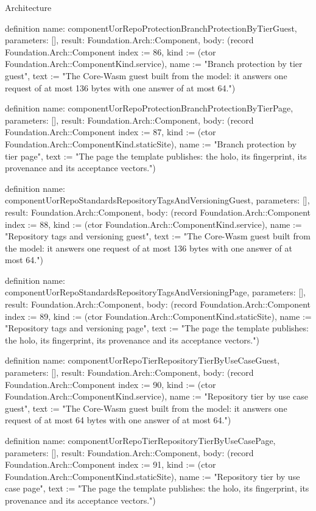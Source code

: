 \begin{lexlean}{Architecture}
\begin{semanticmodule}
definition{
  name: componentUorRepoProtectionBranchProtectionByTierGuest,
  parameters: [],
  result: Foundation.Arch::Component,
  body: (record Foundation.Arch::Component {index := 86, kind := (ctor Foundation.Arch::ComponentKind.service), name := "Branch protection by tier guest", text := "The Core-Wasm guest built from the model: it answers one request of at most 136 bytes with one answer of at most 64."})
}

definition{
  name: componentUorRepoProtectionBranchProtectionByTierPage,
  parameters: [],
  result: Foundation.Arch::Component,
  body: (record Foundation.Arch::Component {index := 87, kind := (ctor Foundation.Arch::ComponentKind.staticSite), name := "Branch protection by tier page", text := "The page the template publishes: the holo, its fingerprint, its provenance and its acceptance vectors."})
}

definition{
  name: componentUorRepoStandardsRepositoryTagsAndVersioningGuest,
  parameters: [],
  result: Foundation.Arch::Component,
  body: (record Foundation.Arch::Component {index := 88, kind := (ctor Foundation.Arch::ComponentKind.service), name := "Repository tags and versioning guest", text := "The Core-Wasm guest built from the model: it answers one request of at most 136 bytes with one answer of at most 64."})
}

definition{
  name: componentUorRepoStandardsRepositoryTagsAndVersioningPage,
  parameters: [],
  result: Foundation.Arch::Component,
  body: (record Foundation.Arch::Component {index := 89, kind := (ctor Foundation.Arch::ComponentKind.staticSite), name := "Repository tags and versioning page", text := "The page the template publishes: the holo, its fingerprint, its provenance and its acceptance vectors."})
}

definition{
  name: componentUorRepoTierRepositoryTierByUseCaseGuest,
  parameters: [],
  result: Foundation.Arch::Component,
  body: (record Foundation.Arch::Component {index := 90, kind := (ctor Foundation.Arch::ComponentKind.service), name := "Repository tier by use case guest", text := "The Core-Wasm guest built from the model: it answers one request of at most 64 bytes with one answer of at most 64."})
}

definition{
  name: componentUorRepoTierRepositoryTierByUseCasePage,
  parameters: [],
  result: Foundation.Arch::Component,
  body: (record Foundation.Arch::Component {index := 91, kind := (ctor Foundation.Arch::ComponentKind.staticSite), name := "Repository tier by use case page", text := "The page the template publishes: the holo, its fingerprint, its provenance and its acceptance vectors."})
}


\end{semanticmodule}
\end{lexlean}
